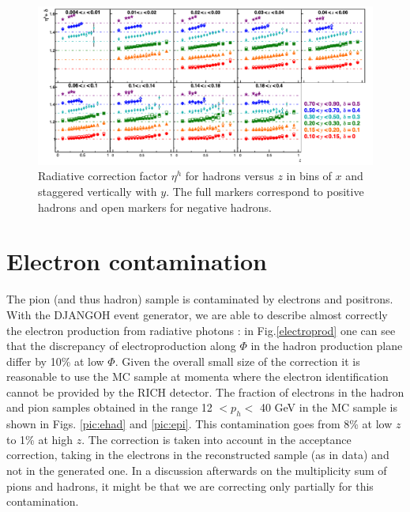 \begin{figure}
	\includegraphics[scale=0.5]{./gfx/RadCor.png}
	\caption{Radiative correction factor $\eta^{h}$ for hadrons versus $z$ in bins of $x$ and staggered vertically with $y$. The full markers correspond to positive hadrons and open markers for negative hadrons.}
	\label{RadCor}
\end{figure}

\newpage

\section{Electron contamination}

The pion (and thus hadron) sample is contaminated by electrons and positrons. With the DJANGOH event generator, we are able to describe almost correctly the electron production from radiative photons : in Fig.\ref{electroprod} one can see that the discrepancy of electroproduction along $\Phi$ in the hadron production plane differ by 10\% at low $\Phi$. Given the overall small size of the correction it is reasonable to use the MC sample at momenta where the electron identification cannot be provided by the RICH detector. The fraction of electrons in the hadron and pion samples obtained in the range 12 $< p_h <$ 40 GeV in the MC sample is shown in Figs. \ref{pic:ehad} and \ref{pic:epi}. This contamination goes from 8\% at low $z$ to 1\% at high $z$. The correction is taken into account in the acceptance correction, taking in the electrons in the reconstructed sample (as in data) and not in the generated one. In a discussion afterwards on the multiplicity sum of pions and hadrons, it might be that we are correcting only partially for this contamination.
